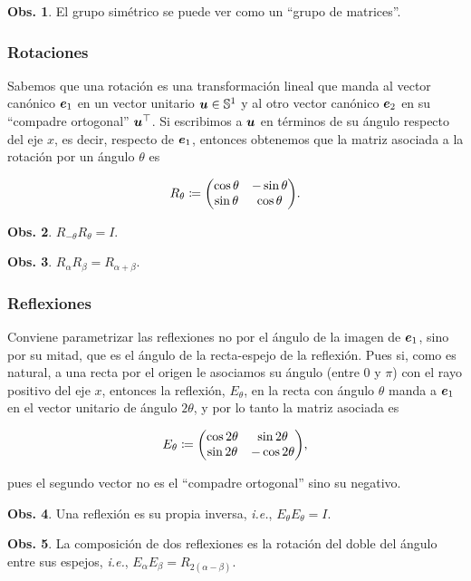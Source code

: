 \documentclass{article}
\theoremstyle{definicion}
\theoremstyle{definition}             %
\theoremstyle{definition}             %
\theoremstyle{definition}
\theoremstyle{definition}
\theoremstyle{observacion}
\newtheorem{obs}{Obs.}
\theoremstyle{definition}
\theoremstyle{plain}
\theoremstyle{definition}
\theoremstyle{afirmacion}
\theoremstyle{notation}
\theoremstyle{definition}
\begin{document}
    \begin{obs}
        El grupo simétrico se puede ver como un ``grupo de matrices''.
    \end{obs}

    \subsubsection*{Rotaciones}

    Sabemos que una rotación es una transformación lineal que manda al vector canónico \(\vb*{e}_{1}\) en un vector unitario \(\vb*{u} \in \mathbb{S}^{1}\) y al otro vector canónico \(\vb*{e}_{2}\) en su ``compadre ortogonal'' \(\vb*{u}^{\top}\). Si escribimos a \(\vb*{u}\) en términos de su ángulo respecto del eje \(x\), es decir, respecto de \(\vb*{e}_{1}\), entonces obtenemos que la matriz asociada a la rotación por un ángulo \(\theta\) es

    \begin{equation*}
        R_{\theta} \coloneq \mqty(\cos\theta & -\sin \theta \\ \sin\theta & \cos\theta).
    \end{equation*}

    \begin{obs}
        \(R_{-\theta}R_{\theta} = I\).
    \end{obs}

    \begin{obs}
        \(R_{\alpha}R_{\beta} = R_{\alpha + \beta}\).
    \end{obs}

    \subsubsection*{Reflexiones}

    Conviene parametrizar las reflexiones no por el ángulo de la imagen de \(\vb*{e}_{1}\), sino por su mitad, que es el ángulo de la recta-espejo de la reflexión. Pues si, como es natural, a una recta por el origen le asociamos su ángulo (entre \(0\) y \(\pi\)) con el rayo positivo del eje \(x\), entonces la reflexión, \(E_{\theta}\), en la recta con ángulo \(\theta\) manda a \(\vb*{e}_{1}\) en el vector unitario de ángulo \(2\theta\), y por lo tanto la matriz asociada es
    
    \begin{equation*}
        E_{\theta} \coloneq \mqty(\cos 2\theta & \sin 2\theta\\ \sin 2\theta & -\cos 2\theta),
    \end{equation*}

    pues el segundo vector no es el ``compadre ortogonal'' sino su negativo.

    \begin{obs}
        Una reflexión es su propia inversa, \emph{i.e.}, \(E_{\theta}E_{\theta} = I\).
    \end{obs}

    \begin{obs}
        La composición de dos reflexiones es la rotación del doble del ángulo entre sus espejos, \emph{i.e.}, \(E_{\alpha}E_{\beta} = R_{2(\alpha - \beta)}\).
    \end{obs}
\end{document}
